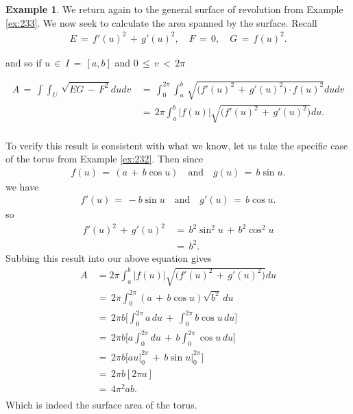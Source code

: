 \documentclass{UKZNcomp}
\theoremstyle{definition}
\newtheorem{example}[definition]{Example}
\theoremstyle{remark}
\begin{document}
\begin{example}
We return again to the general surface of revolution from Example \ref{ex:233}. We now seek to calculate the area spanned by the surface. Recall
\begin{align*}
E\,=\,f'(u)^2\,+\,g'(u)^2, \quad F\,=\,0,\quad G\,=\,f(u)^2.
\end{align*}

and so if $u\,\in\,I\,=\,[a,b]$ and $0\,\leq\,v\,<\,2\pi$

\begin{align*}
A\,=\,\int\int_U\,\sqrt{EG\,-\,F^2}dudv\,&=\,\int_0^{2\pi}\int_a^b\, \sqrt{\big(f'(u)^2\,+\,g'(u)^2\big)\cdot f(u)^2}dudv\\
&=\,2\pi\int_a^b\lvert f(u) \rvert \sqrt{\big(f'(u)^2\,+\,g'(u)^2\big)}du.\\
\end{align*}

To verify this result is consistent with what we know, let us take the specific case of the torus from Example \ref{ex:232}. Then since
\begin{align*}
f(u)\,=\,(a\,+\,b\cos u)\quad \text{and} \quad g(u)\,=\,b\sin u.
\end{align*}
we have
\begin{align*}
f'(u)\,=\,-b\sin u\quad \text{and} \quad g'(u)\,=\,b\cos u.
\end{align*}
so
\begin{align*}
f'(u)^2\,+\,g'(u)^2\,&=\,b^2\sin^2u\,+\,b^2\cos^2u\\
&=\,b^2.
\end{align*}
Subbing this result into our above equation gives
\begin{align*}
A\,&=2\pi\int_a^b\lvert f(u) \rvert \sqrt{\big(f'(u)^2\,+\,g'(u)^2\big)}du\\
&=\,2\pi\int_0^{2\pi}(a\,+\,b\cos u)\sqrt{b^2}\,du\\
&=\,2\pi b\bigg[\int_0^{2\pi} a\,du \,+\,\int_0^{2\pi}b\cos u\,du\bigg]\\
&=\,2\pi b\bigg[a\int_0^{2\pi}du \,+\,b\int_0^{2\pi}\cos u\,du\bigg]\\
&=\,2\pi b\bigg[a\left. u \right|_0^{2\pi}\,+\,b\left.\sin u \right|_0^{2\pi}\bigg]\\
&=\,2\pi b [2\pi a]\\
&=\, 4\pi^2 a b.\\
\end{align*}
Which is indeed the surface area of the torus.
\end{example}
\end{document}
